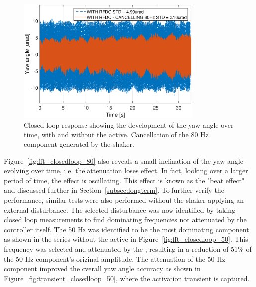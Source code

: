 \begin{figure}[h!]
  \centering %
  \includegraphics[width=0.8\textwidth, trim=0cm 0cm 0cm 0.7cm, clip=true]{fig/matlab/yl_closedloop_ext_disturbance_80Hz_2}
  \caption{\label{fig:yl_closedloop_80} Closed loop response showing the development of the yaw angle over time, with and without the \abbrRFDC active. Cancellation of the 80 Hz component generated by the shaker.}
\end{figure}

Figure~\ref{fig:fft_closedloop_80} also reveals a small inclination of the yaw angle evolving over time, i.e. the attenuation loses effect. In fact, looking over a larger period of time, the effect is oscillating. This effect is known as the "beat effect" and discussed further in Section~\ref{subsec:longterm}.
To further verify the performance, similar tests were also performed without the shaker applying an external disturbance. The selected disturbance was now identified by taking closed loop measurements to find dominating frequencies not attenuated by the controller itself. The 50 Hz was identified to be the most dominating component as shown in the series without the \abbrRFDC active in Figure~\ref{fig:fft_closedloop_50}. This frequency was selected and attenuated by the \abbrRFDC, resulting in a reduction of 51\% of the 50 Hz component's original amplitude. The attenuation of the 50 Hz component improved the overall yaw angle accuracy as shown in Figure~\ref{fig:transient_closedloop_50}, where the activation transient is captured.

